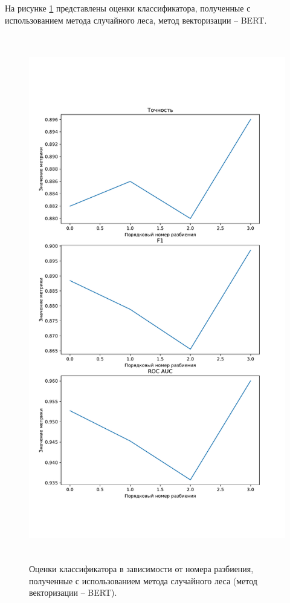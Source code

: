 На рисунке \ref{img:randomMetricsBert} представлены оценки классификатора, полученные с использованием метода случайного леса, метод векторизации -- BERT.
\begin{figure}[H]
	\centering
	\includegraphics[height=23cm]{inc/plots/randomMetricsBert.pdf}
	\caption{ Оценки классификатора в зависимости от номера разбиения, полученные с использованием метода случайного леса (метод векторизации -- BERT). }
	\label{img:randomMetricsBert}
\end{figure}




